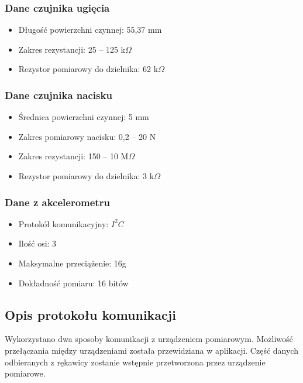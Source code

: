 \documentclass[10pt,a4paper]{article}
\begin{document}
\subsubsection{Dane czujnika ugięcia}
\begin{itemize}
\item Długość powierzchni czynnej: 55,37 mm
\item Zakres rezystancji: 25 -- 125 k$\Omega$
\item Rezystor pomiarowy do dzielnika: 62 k$\Omega$
\end{itemize}
\subsubsection{Dane czujnika nacisku}
\begin{itemize}
\item Średnica powierzchni czynnej: 5 mm
\item Zakres pomiarowy nacisku: 0,2 -- 20 N
\item Zakres rezystancji: 150 -- 10 M$\Omega$
\item Rezystor pomiarowy do dzielnika: 3 k$\Omega$
\end{itemize}
\subsubsection{Dane z akcelerometru}
\begin{itemize}
\item Protokół komunikacyjny: $I^2C$
\item Ilość osi: 3
\item Maksymalne przeciążenie: 16g
\item Dokładność pomiaru: 16 bitów 
\end{itemize}

\subsection{Opis protokołu komunikacji}
Wykorzystano dwa sposoby komunikacji z urządzeniem pomiarowym. Możliwość przełączania między urządzeniami została przewidziana w aplikacji. Część danych odbieranych z rękawicy zostanie wstępnie przetworzona przez urządzenie pomiarowe.\\
\end{document}
